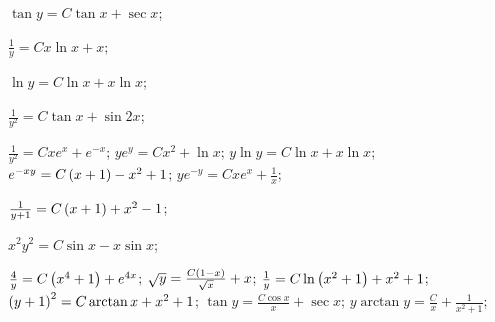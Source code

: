 \begin{enumsols}
		\item \( \tan{y} = C \tan{x} + \sec{x} \); \sfill %
		\item \( \frac{1}{y} = C x \ln{x} + x \); \sfill %
		\item \( \ln{y} = C \ln{x} + x \ln{x} \); \sfill %
		\item \( \frac{1}{y^2} = C \tan{x} + \sin{2x} \); \sfill %
		\item \( \frac{1}{y^2} = C xe^{x} + e^{-x} \); \sfill %
		\itemstar \( ye^{y} = C x^2 + \ln{x} \); \sfill %
		\itemstar \( y \ln{y} = C \ln{x} + x\ln{x} \); \sfill %
		\itemstar \( e^{-xy} = C \left( x + 1 \right) - x^2 + 1 \); \sfill %
		\itemstar \( ye^{-y} = C xe^{x} + \frac{1}{x} \); \sfill %

		\label{firstorder:to_linear2}
		\item \( \frac{1}{y + 1} = C \left( x + 1 \right) + x^2 - 1 \); \sfill %
		\item \( x^2 y^2 = C\sin{x} - x \sin{x} \); \sfill %
		\item \( \frac{4}{y} = C \left( x^4 + 1 \right) + e^{4x} \); \sfill %
		\itemstar \( \sqrt{y} = \frac{C \left( 1 - x \right)}{\sqrt{x}} + x \); \sfill %
		\itemstar \( \frac{1}{y} = C \ln{ \left( x^2 + 1 \right) } + x^2 + 1 \); \sfill %
		\itemstar \( \left( y + 1 \right)^2 = C \arctan{x} + x^2 + 1 \); \sfill %
		\itemstar \( \tan{y} = \frac{C \cos{x}}{x} + \sec{x} \); \sfill %
		\itemstar \( y \arctan{y} = \frac{C}{x} + \frac{1}{x^2 + 1} \); \sfill %


\end{enumsols}
